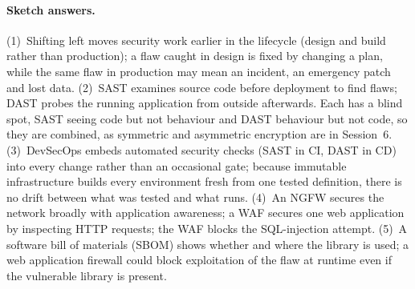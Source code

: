 \paragraph{Sketch answers.}
{\small
(1)~Shifting left moves security work earlier in the lifecycle (design and
build rather than production); a flaw caught in design is fixed by changing a
plan, while the same flaw in production may mean an incident, an emergency
patch and lost data. (2)~SAST examines source code before deployment to find
flaws; DAST probes the running application from outside afterwards. Each has a
blind spot, SAST seeing code but not behaviour and DAST behaviour but not
code, so they are combined, as symmetric and asymmetric encryption are in
Session~6. (3)~DevSecOps embeds automated security checks (SAST in CI, DAST in
CD) into every change rather than an occasional gate; because immutable
infrastructure builds every environment fresh from one tested definition,
there is no drift between what was tested and what runs. (4)~An NGFW secures
the network broadly with application awareness; a WAF secures one web
application by inspecting HTTP requests; the WAF blocks the SQL-injection
attempt. (5)~A software bill of materials (SBOM) shows whether and where the
library is used; a web application firewall could block exploitation of the
flaw at runtime even if the vulnerable library is present.}


